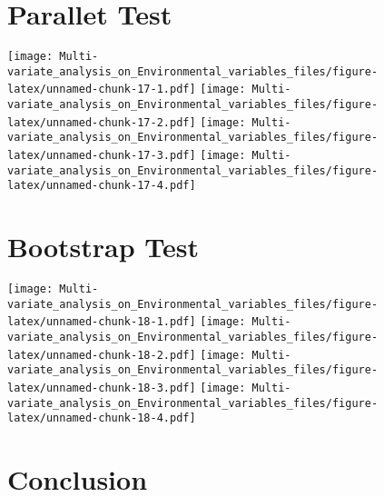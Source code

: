 \documentclass[]{book}
\begin{document}
\hypertarget{parallet-test}{%
\section{Parallet Test}\label{parallet-test}}

\texttt{[image: Multi-variate\_analysis\_on\_Environmental\_variables\_files/figure-latex/unnamed-chunk-17-1.pdf]}
\texttt{[image: Multi-variate\_analysis\_on\_Environmental\_variables\_files/figure-latex/unnamed-chunk-17-2.pdf]}
\texttt{[image: Multi-variate\_analysis\_on\_Environmental\_variables\_files/figure-latex/unnamed-chunk-17-3.pdf]}
\texttt{[image: Multi-variate\_analysis\_on\_Environmental\_variables\_files/figure-latex/unnamed-chunk-17-4.pdf]}

\hypertarget{bootstrap-test}{%
\section{Bootstrap Test}\label{bootstrap-test}}

\texttt{[image: Multi-variate\_analysis\_on\_Environmental\_variables\_files/figure-latex/unnamed-chunk-18-1.pdf]}
\texttt{[image: Multi-variate\_analysis\_on\_Environmental\_variables\_files/figure-latex/unnamed-chunk-18-2.pdf]}
\texttt{[image: Multi-variate\_analysis\_on\_Environmental\_variables\_files/figure-latex/unnamed-chunk-18-3.pdf]}
\texttt{[image: Multi-variate\_analysis\_on\_Environmental\_variables\_files/figure-latex/unnamed-chunk-18-4.pdf]}

\hypertarget{conclusion}{%
\section{Conclusion}\label{conclusion}}
\end{document}
